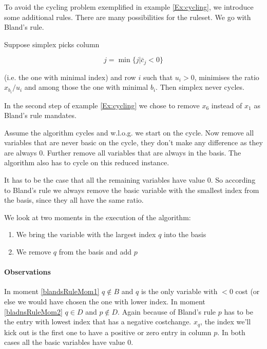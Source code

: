 To avoid the cycling problem exemplified in example \ref{Ex:cycling}, we introduce some additional rules. There are many possibilities for the ruleset. We go with Bland's rule.

\begin{thm} Suppose simplex picks column 

\[j=\min \{j|\bar c_j < 0\}\]

(i.e. the one with minimal index) and row $i$ such that $u_i>0$, minimises the ratio $x_{b_i}/u_i$ and among those the one with minimal $b_i$. Then simplex never cycles.
\end{thm}

In the second step of example \ref{Ex:cycling} we chose to remove $x_6$ instead of $x_1$ as Bland's rule mandates.

\begin{pr} Assume the algorithm cycles and w.l.o.g. we start on the cycle. Now remove all variables that are never basic on the cycle, they don't make any difference as they are always 0. Further remove all variables that are always in the basis. The algorithm also has to cycle on this reduced instance. 

It has to be the case that all the remaining variables have value 0. %
So according to Bland's rule we always remove the basic variable with the smallest index from the basis, since they all have the same ratio.

We look at two moments in the execution of the algorithm:

\begin{enumerate}
\item \label{blandsRuleMom1} We bring the variable with the largest index $q$ into the basis
\item \label{blandsRuleMom2} We remove $q$ from the basis and add $p$
\end{enumerate}

\paragraph{Observations} In moment \ref{blandsRuleMom1} $q\not \in B$ and $q$ is the only variable with $<0$ cost (or else we would have chosen the one with lower index. In moment \ref{bladnsRuleMom2} $q\in D$ and $p\not \in D$. Again because of Bland's rule $p$ has to be the entry with lowest index that has a negative costchange. $x_q$, the index we'll kick out is the first one to have a positive or zero entry in column $p$. In both cases all the basic variables have value 0.


\end{pr}
